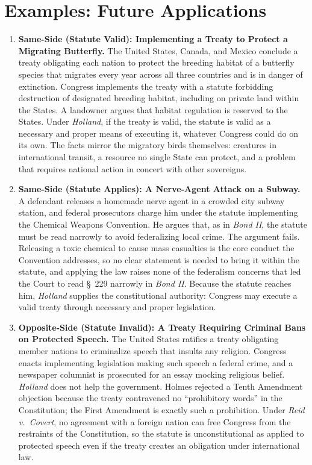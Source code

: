 \documentclass[12pt]{article}
\begin{document}
\section{Examples: Future Applications}
\begin{enumerate}

\item \textbf{Same-Side (Statute Valid): Implementing a Treaty to Protect a Migrating Butterfly.} The United States, Canada, and Mexico conclude a treaty obligating each nation to protect the breeding habitat of a butterfly species that migrates every year across all three countries and is in danger of extinction. Congress implements the treaty with a statute forbidding destruction of designated breeding habitat, including on private land within the States. A landowner argues that habitat regulation is reserved to the States. Under \textit{Holland}, if the treaty is valid, the statute is valid as a necessary and proper means of executing it, whatever Congress could do on its own. The facts mirror the migratory birds themselves: creatures in international transit, a resource no single State can protect, and a problem that requires national action in concert with other sovereigns.

\item \textbf{Same-Side (Statute Applies): A Nerve-Agent Attack on a Subway.} A defendant releases a homemade nerve agent in a crowded city subway station, and federal prosecutors charge him under the statute implementing the Chemical Weapons Convention. He argues that, as in \textit{Bond II}, the statute must be read narrowly to avoid federalizing local crime. The argument fails. Releasing a toxic chemical to cause mass casualties is the core conduct the Convention addresses, so no clear statement is needed to bring it within the statute, and applying the law raises none of the federalism concerns that led the Court to read \S~229 narrowly in \textit{Bond II}. Because the statute reaches him, \textit{Holland} supplies the constitutional authority: Congress may execute a valid treaty through necessary and proper legislation.

\item \textbf{Opposite-Side (Statute Invalid): A Treaty Requiring Criminal Bans on Protected Speech.} The United States ratifies a treaty obligating member nations to criminalize speech that insults any religion. Congress enacts implementing legislation making such speech a federal crime, and a newspaper columnist is prosecuted for an essay mocking religious belief. \textit{Holland} does not help the government. Holmes rejected a Tenth Amendment objection because the treaty contravened no ``prohibitory words'' in the Constitution; the First Amendment is exactly such a prohibition. Under \textit{Reid v.\ Covert}, no agreement with a foreign nation can free Congress from the restraints of the Constitution, so the statute is unconstitutional as applied to protected speech even if the treaty creates an obligation under international law.


\end{enumerate}
\end{document}
